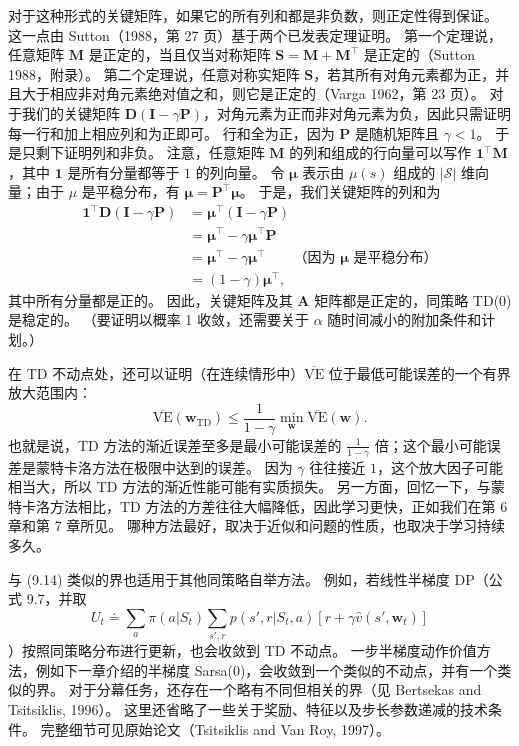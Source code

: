 \documentclass[UTF8,12pt,a4paper,fontset=fandol]{ctexart}
\begin{document}
\begin{center}
{\begin{minipage}{0.9\textwidth}
对于这种形式的关键矩阵，如果它的所有列和都是非负数，则正定性得到保证。
这一点由 Sutton（1988，第 27 页）基于两个已发表定理证明。
第一个定理说，任意矩阵 $\mathbf{M}$ 是正定的，当且仅当对称矩阵 $\mathbf{S}=\mathbf{M}+\mathbf{M}^\top$ 是正定的（Sutton 1988，附录）。
第二个定理说，任意对称实矩阵 $\mathbf{S}$，若其所有对角元素都为正，并且大于相应非对角元素绝对值之和，则它是正定的（Varga 1962，第 23 页）。
对于我们的关键矩阵 $\mathbf{D}(\mathbf{I}-\gamma\mathbf{P})$，对角元素为正而非对角元素为负，因此只需证明每一行和加上相应列和为正即可。
行和全为正，因为 $\mathbf{P}$ 是随机矩阵且 $\gamma<1$。
于是只剩下证明列和非负。
注意，任意矩阵 $\mathbf{M}$ 的列和组成的行向量可以写作 $\mathbf{1}^\top\mathbf{M}$，其中 $\mathbf{1}$ 是所有分量都等于 $1$ 的列向量。
令 $\boldsymbol{\mu}$ 表示由 $\mu(s)$ 组成的 $|\mathcal{S}|$ 维向量；由于 $\mu$ 是平稳分布，有 $\boldsymbol{\mu}=\mathbf{P}^\top\boldsymbol{\mu}$。
于是，我们关键矩阵的列和为
\begin{align*}
\mathbf{1}^\top\mathbf{D}(\mathbf{I}-\gamma\mathbf{P})
&=\boldsymbol{\mu}^\top(\mathbf{I}-\gamma\mathbf{P})\\
&=\boldsymbol{\mu}^\top-\gamma\boldsymbol{\mu}^\top\mathbf{P}\\
&=\boldsymbol{\mu}^\top-\gamma\boldsymbol{\mu}^\top
\qquad\text{（因为 $\boldsymbol{\mu}$ 是平稳分布）}\\
&=(1-\gamma)\boldsymbol{\mu}^\top,
\end{align*}
其中所有分量都是正的。
因此，关键矩阵及其 $\mathbf{A}$ 矩阵都是正定的，同策略 TD(0) 是稳定的。
（要证明以概率 1 收敛，还需要关于 $\alpha$ 随时间减小的附加条件和计划。）
\end{minipage}}
\end{center}

在 TD 不动点处，还可以证明（在连续情形中）$\overline{\mathrm{VE}}$ 位于最低可能误差的一个有界放大范围内：
\begin{equation}
\overline{\mathrm{VE}}(\mathbf{w}_{\mathrm{TD}})
\le \frac{1}{1-\gamma}\min_{\mathbf{w}}\overline{\mathrm{VE}}(\mathbf{w}).
\tag{9.14}
\end{equation}
也就是说，TD 方法的渐近误差至多是最小可能误差的 $\frac{1}{1-\gamma}$ 倍；这个最小可能误差是蒙特卡洛方法在极限中达到的误差。
因为 $\gamma$ 往往接近 $1$，这个放大因子可能相当大，所以 TD 方法的渐近性能可能有实质损失。
另一方面，回忆一下，与蒙特卡洛方法相比，TD 方法的方差往往大幅降低，因此学习更快，正如我们在第 6 章和第 7 章所见。
哪种方法最好，取决于近似和问题的性质，也取决于学习持续多久。

与 (9.14) 类似的界也适用于其他同策略自举方法。
例如，若线性半梯度 DP（公式 9.7，并取
\[
U_t\doteq \sum_a\pi(a|S_t)\sum_{s',r}p(s',r|S_t,a)\left[r+\gamma\hat{v}(s',\mathbf{w}_t)\right]
\]
）按照同策略分布进行更新，也会收敛到 TD 不动点。
一步半梯度动作价值方法，例如下一章介绍的半梯度 Sarsa(0)，会收敛到一个类似的不动点，并有一个类似的界。
对于分幕任务，还存在一个略有不同但相关的界（见 Bertsekas and Tsitsiklis, 1996）。
这里还省略了一些关于奖励、特征以及步长参数递减的技术条件。
完整细节可见原始论文（Tsitsiklis and Van Roy, 1997）。
\end{document}
